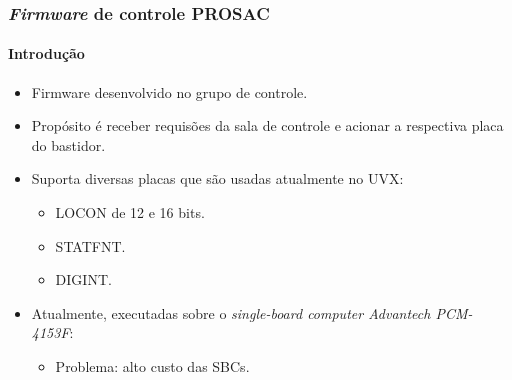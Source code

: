 \documentclass{beamer}
\begin{document}
\begin{frame}
\frametitle {\textit{Firmware} de controle PROSAC}
\framesubtitle{Introdução}

\begin{itemize}
  \item Firmware desenvolvido no grupo de controle.
  \item Propósito é receber requisões da sala de controle e acionar a respectiva placa do bastidor. 
  \item Suporta diversas placas que são usadas atualmente no UVX:
  \begin{itemize}
    \item LOCON de 12 e 16 bits.
    \item STATFNT.
    \item DIGINT.
   \end{itemize}
   \item Atualmente, executadas sobre o \textit{single-board computer Advantech
   PCM-4153F}:
   \begin{itemize} 
   		\item Problema: alto custo das SBCs.
   \end{itemize} 
\end{itemize}

\end{frame}

\end{document}
